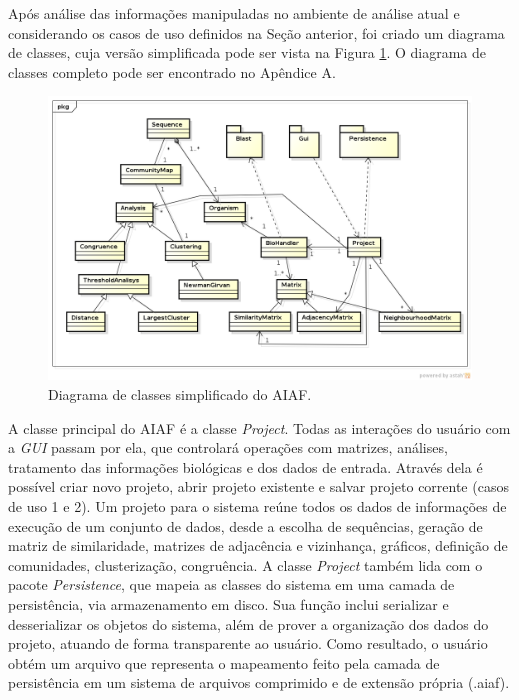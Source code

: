 Após análise das informações manipuladas no ambiente de análise atual e considerando os casos de uso definidos na Seção anterior,
foi criado um diagrama de classes, cuja versão simplificada pode ser vista na Figura
\ref{fig:diagrama-classes-simplificado}. O diagrama de classes completo pode ser encontrado no Apêndice A.

\begin{figure}
\centering
\includegraphics[scale=0.52]{diagrama-classes-simplificado}
\caption{Diagrama de classes simplificado do AIAF.}
\label{fig:diagrama-classes-simplificado}
\end{figure}

A classe principal do AIAF é a classe \textit{Project}. Todas as interações do usuário com a \textit{GUI} passam por ela, que controlará operações com
matrizes, análises, tratamento das informações biológicas e dos dados de entrada. Através dela é possível criar novo projeto, abrir projeto existente e
salvar projeto corrente (casos de uso 1 e 2). Um projeto para o sistema reúne todos os dados de informações de execução de um conjunto de dados, desde
a escolha de sequências, geração de matriz de similaridade, matrizes de adjacência e vizinhança, gráficos, definição de comunidades, clusterização,
congruência. A classe \textit{Project} também lida com o pacote \textit{Persistence}, que mapeia as classes do sistema em uma camada de persistência, via
armazenamento em disco. Sua função inclui serializar e desserializar os objetos do sistema, além de prover
a organização dos dados do projeto, atuando de forma transparente ao usuário. Como resultado, o usuário obtém um arquivo que representa o mapeamento
feito pela camada de persistência em um sistema de arquivos comprimido e de extensão própria (.aiaf).

